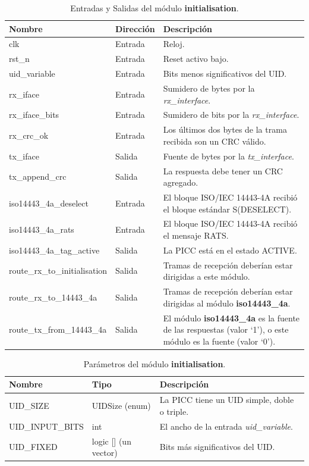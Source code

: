 \documentclass[a4paper, twoside, 11pt]{report}
\begin{document}
\begin{table}[htb]
  \centering
  \tablezebra
  \begin{tabulary}{\linewidth}{l|l|L}
    \textbf{Nombre}&\textbf{Dirección}&\textbf{Descripción} \\
    \hline
    clk&Entrada&Reloj. \\
    rst\_n&Entrada&Reset activo bajo. \\
    uid\_variable&Entrada&Bits menos significativos del UID. \\
    rx\_iface&Entrada&Sumidero de bytes por la \textit{rx\_interface}. \\
    rx\_iface\_bits&Entrada&Sumidero de bits por la \textit{rx\_interface}. \\
    rx\_crc\_ok&Entrada&Los últimos dos bytes de la trama recibida son un CRC válido. \\
    tx\_iface&Salida&Fuente de bytes por la \textit{tx\_interface}. \\
    tx\_append\_crc&Salida&La respuesta debe tener un CRC agregado. \\
    iso14443\_4a\_deselect&Entrada&El bloque ISO/IEC 14443-4A recibió el bloque estándar S(DESELECT). \\
    iso14443\_4a\_rats&Entrada&El bloque ISO/IEC 14443-4A recibió el mensaje RATS. \\
    iso14443\_4a\_tag\_active&Salida&La PICC está en el estado ACTIVE. \\
    route\_rx\_to\_initialisation&Salida&Tramas de recepción deberían estar dirigidas a este módulo. \\
    route\_rx\_to\_14443\_4a&Salida&Tramas de recepción deberían estar dirigidas al módulo \textbf{iso14443\_4a}. \\
    route\_tx\_from\_14443\_4a&Salida&El módulo \textbf{iso14443\_4a} es la fuente de las respuestas (valor ‘1’), o este módulo es la fuente (valor ‘0’). \\
  \end{tabulary}
  \caption{Entradas y Salidas del módulo \textbf{initialisation}.}
  \label{tab:ports_initialisation}
\end{table}

\begin{table}[htb]
  \centering
  \tablezebra
  \begin{tabulary}{\linewidth}{l|l|L}
    \setcounter{rownum}{0}
    \textbf{Nombre}&\textbf{Tipo}&\textbf{Descripción} \\
    \hline
    UID\_SIZE&UIDSize (enum)&La PICC tiene un UID simple, doble o triple. \\
    UID\_INPUT\_BITS&int&El ancho de la entrada \textit{uid\_variable}. \\
    UID\_FIXED&logic [] (un vector)&Bits más significativos del UID. \\
  \end{tabulary}
  \caption{Parámetros del módulo \textbf{initialisation}.}
  \label{tab:params_initialisation}
\end{table}
\end{document}
